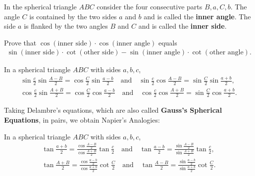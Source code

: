 \begin{tcolorbox}[title={The Sine Formulae (from ``Spherical Astronomy'')}]
\begin{definition}
        In the spherical triangle $ABC$ consider the four consecutive parts $B,a,C,b$. The angle $C$ is contained by the two sides $a$ and $b$ and is called the \textbf{inner angle}. The side $a$ is flanked by the two angles $B$ and $C$ and is called the \textbf{inner side}.
    \end{definition}
    \begin{question}[name={Four-Part Identity}]
        Prove that $\cos(\text{inner side})\cdot \cos(\text{inner angle})$ equals
        \begin{align*}
            \sin(\text{inner side})\cdot \cot(\text{other side}) - \sin(\text{inner angle})\cdot \cot(\text{other angle}).
        \end{align*}
    \end{question}    
\end{tcolorbox}


\begin{tcolorbox}[title={Delambre's and Napier's Analogies}]
    \begin{question}[name={Delambre's Aanlogies}]
        In a spherical triangle $ABC$ with sides $a,b,c$,
        \begin{align*}
            \sin\frac{c}{2}\sin\frac{A-B}{2} = \cos\frac{C}{2}\sin\frac{a-b}{2} \quad \text{and} \quad
            \sin\frac{c}{2}\cos\frac{A-B}{2} = \sin\frac{C}{2}\sin\frac{a+b}{2},\\
            \cos\frac{c}{2}\sin\frac{A+B}{2} = \cos\frac{C}{2}\cos\frac{a-b}{2} \quad \text{and} \quad
            \cos\frac{c}{2}\cos\frac{A+B}{2} = \sin\frac{C}{2}\cos\frac{a+b}{2}.
        \end{align*}
    \end{question}
\end{tcolorbox}

\noindent Taking Delambre's equations, which are also called \textbf{Gauss's Spherical Equations}, in pairs, we obtain Napier's Analogies:

\begin{tcolorbox}[title={Napier's Analogies}]
\begin{question}[name={Napier's Aanlogies}]
        In a spherical triangle $ABC$ with sides $a,b,c$,
        \begin{align*}
            \tan\frac{a+b}{2} = \frac{\displaystyle\cos\frac{A-B}{2}}{\displaystyle\cos\frac{A+B}{2}}\tan\frac{c}{2} \quad \text{and} \quad
            \tan\frac{a-b}{2} = \frac{\displaystyle\sin\frac{A-B}{2}}{\displaystyle\sin\frac{A+B}{2}}\tan\frac{c}{2},\\
            \tan\frac{A+B}{2} = \frac{\displaystyle\cos\frac{a-b}{2}}{\displaystyle\cos\frac{a+b}{2}}\cot\frac{C}{2} \quad \text{and} \quad
            \tan\frac{A-B}{2} = \frac{\displaystyle\sin\frac{a-b}{2}}{\displaystyle\sin\frac{a+b}{2}}\cot\frac{C}{2}.
        \end{align*}
    \end{question}
\end{tcolorbox}




